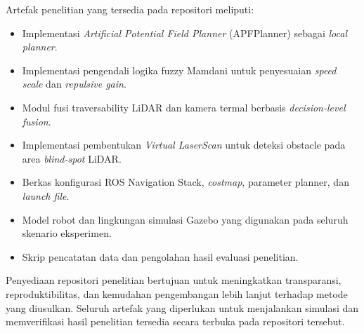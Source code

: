 \documentclass[10pt,twocolumn]{article}
\begin{document}
Artefak penelitian yang tersedia pada repositori meliputi:

\begin{itemize}
\item Implementasi \textit{Artificial Potential Field Planner} (APFPlanner) sebagai \textit{local planner}.
\item Implementasi pengendali logika fuzzy Mamdani untuk penyesuaian \textit{speed scale} dan \textit{repulsive gain}.
\item Modul fusi traversability LiDAR dan kamera termal berbasis \textit{decision-level fusion}.
\item Implementasi pembentukan \textit{Virtual LaserScan} untuk deteksi obstacle pada area \textit{blind-spot} LiDAR.
\item Berkas konfigurasi ROS Navigation Stack, \textit{costmap}, parameter planner, dan \textit{launch file}.
\item Model robot dan lingkungan simulasi Gazebo yang digunakan pada seluruh skenario eksperimen.
\item Skrip pencatatan data dan pengolahan hasil evaluasi penelitian.
\end{itemize}

Penyediaan repositori penelitian bertujuan untuk meningkatkan transparansi, reproduktibilitas, dan kemudahan pengembangan lebih lanjut terhadap metode yang diusulkan. Seluruh artefak yang diperlukan untuk menjalankan simulasi dan memverifikasi hasil penelitian tersedia secara terbuka pada repositori tersebut.
\end{document}
